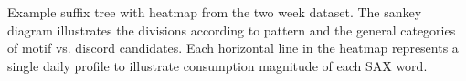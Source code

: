 Example suffix tree with heatmap from the two week dataset. The sankey diagram illustrates the divisions according to pattern and the general categories of motif vs. discord candidates. Each horizontal line in the heatmap represents a single daily profile to illustrate consumption magnitude of each SAX word. \cite{miller_automated_2015}
\label{fig:saxdiscordsankeyheatmap}